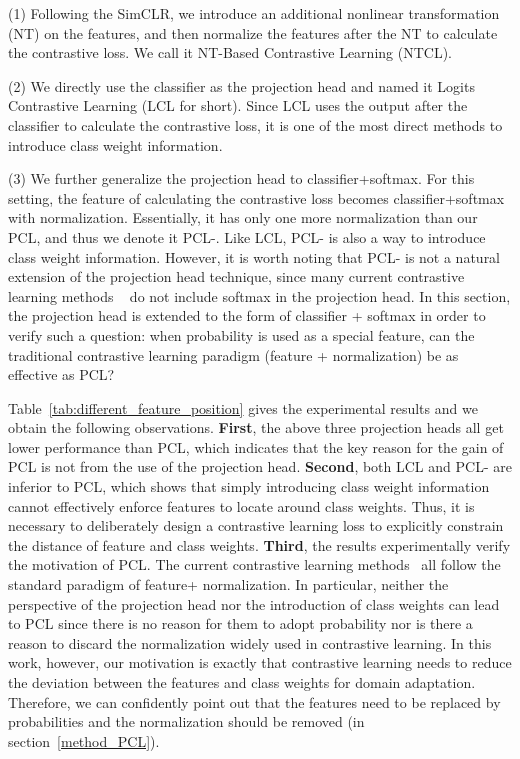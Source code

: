 (1) Following the SimCLR, we introduce an additional nonlinear transformation (NT) on the features, and then normalize the features after the NT to calculate the contrastive loss. We call it NT-Based Contrastive Learning (NTCL).

(2) We directly use the classifier as the projection head and named it Logits Contrastive Learning (LCL for short). Since LCL uses the output after the classifier to calculate the contrastive loss, it is one of the most direct methods to introduce class weight information. 

(3) We further generalize the projection head to classifier+softmax. For this setting, the feature of calculating the contrastive loss becomes classifier+softmax with  normalization. Essentially, it has only one more  normalization than our PCL, and thus we denote it PCL-. Like LCL, PCL- is also a way to introduce class weight information. However, it is worth noting that PCL- is not a natural extension of the projection head technique, since many current contrastive learning methods ~\cite{chen2020simple,dwibedi2021little,chen2021empirical,chen2021exploring} do not include softmax in the projection head. In this section, the projection head is extended to the form of classifier + softmax in order to verify such a question: when probability is used as a special feature, can the traditional contrastive learning paradigm (feature +  normalization) be as effective as PCL? 


Table~\ref{tab:different_feature_position} gives the experimental results and we obtain the following observations.
\textbf{First}, the above three projection heads all get lower performance than PCL, which indicates that the key reason for the gain of PCL is not from the use of the projection head.
\textbf{Second}, both LCL and PCL- are inferior to PCL, which shows that simply introducing class weight information cannot effectively enforce features to locate around class weights. Thus, it is necessary to deliberately design a contrastive learning loss to explicitly constrain the distance of feature and class weights.
\textbf{Third}, the results experimentally verify the motivation of PCL. The current contrastive learning methods~\cite{dwibedi2021little, chen2021empirical, chen2021exploring} all follow the standard paradigm of feature+ normalization. In particular, neither the perspective of the projection head nor the introduction of class weights can lead to PCL since there is no reason for them to adopt probability nor is there a reason to discard the  normalization widely used in contrastive learning.
In this work, however, our motivation is exactly that contrastive learning needs to reduce the deviation between the features and class weights for domain adaptation. Therefore, we can confidently point out that the features need to be replaced by probabilities and the  normalization should be removed  (in section~\ref{method_PCL}). 







